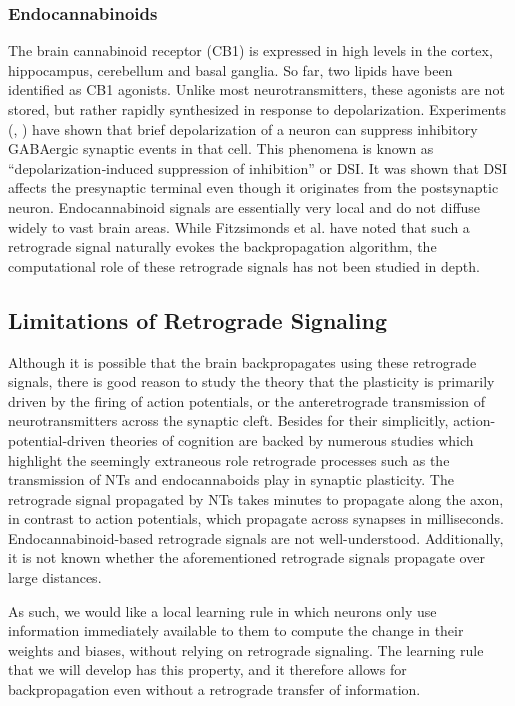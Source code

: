\documentclass[12pt]{article}
\begin{document}
\subsubsection{Endocannabinoids}
The brain cannabinoid receptor (CB1) is expressed in high levels in the cortex, hippocampus, cerebellum and basal ganglia. \cite{Wilson2002} So far, two lipids have been identified as CB1 agonists. Unlike most neurotransmitters, these agonists are not stored, but rather rapidly synthesized in response to depolarization. Experiments (\cite{Pitler1992}, \cite{Llano1991}) have shown that brief depolarization of a neuron can suppress inhibitory GABAergic synaptic events in that cell. This phenomena is known as ``depolarization‐induced suppression of inhibition'' or DSI. It was shown that DSI affects the presynaptic terminal even though it originates from the postsynaptic neuron. Endocannabinoid signals are essentially very local and do not diffuse widely to vast brain areas. \cite{Wilson2001} While Fitzsimonds et al. \cite{Fitzsimons1997} have noted that such a retrograde signal naturally evokes the backpropagation algorithm, the computational role of these retrograde signals has not been studied in depth.

\subsection{Limitations of Retrograde Signaling}
Although it is possible that the brain backpropagates using these retrograde signals, there is good reason to study the theory that the plasticity is primarily driven by the firing of action potentials, or the anteretrograde transmission of neurotransmitters across the synaptic cleft. Besides for their simplicitly, action-potential-driven theories of cognition are backed by numerous studies which highlight the seemingly extraneous role retrograde processes such as the transmission of NTs and endocannaboids play in synaptic plasticity. The retrograde signal propagated by NTs takes minutes to propagate along the axon, \cite{Poo2001} in contrast to action potentials, which propagate across synapses in milliseconds. Endocannabinoid-based retrograde signals are not well-understood. \cite{OhnoShosaku2014} Additionally, it is not known whether the aforementioned retrograde signals propagate over large distances. \cite{Matusica2014}

As such, we would like a local learning rule in which neurons only use information immediately available to them to compute the change in their weights and biases, without relying on retrograde signaling. The learning rule that we will develop has this property, and it therefore allows for backpropagation even without a retrograde transfer of information.
\end{document}
